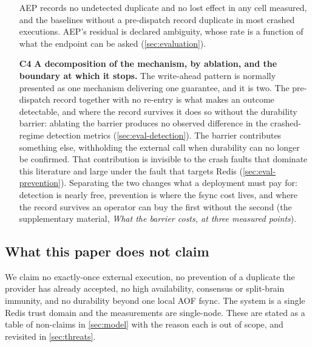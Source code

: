 \begin{itemize}
      AEP records no
      undetected duplicate and no lost effect in any cell measured, and the
      baselines without a pre-dispatch record duplicate in most crashed
      executions. AEP's residual is declared ambiguity, whose rate is a
      function of what the endpoint can be asked (\cref{sec:evaluation}).
\item[\textbf{C4}] \textbf{A decomposition of the mechanism, by ablation,
      and the boundary at which it stops.} The write-ahead pattern is
      normally presented as one mechanism delivering one guarantee, and it is
      two. The pre-dispatch record together with no re-entry
      is what makes an outcome detectable, and where the record survives it
      does so without the
      durability barrier: ablating the barrier produces no observed difference
      in the crashed-regime detection metrics (\cref{sec:eval-detection}). The
      barrier contributes something else, withholding the external call when
      durability can no longer be confirmed. That contribution is invisible to
      the crash faults that dominate this literature and large under the fault
      that targets Redis (\cref{sec:eval-prevention}). Separating the two
      changes what a deployment must pay for: detection is nearly free,
      prevention is where the fsync cost lives, and where the record survives
      an operator can buy the first without the second (the supplementary
      material, \emph{What the barrier costs, at three measured points}).
\end{itemize}

\subsection{What this paper does not claim}

We claim no exactly-once external execution, no prevention of a duplicate the
provider has already accepted, no high availability, consensus or split-brain
immunity, and no durability beyond one local AOF fsync. The system is a single
Redis trust domain and the measurements are single-node. These are stated as a
table of non-claims in \cref{sec:model} with the reason each is out of scope,
and revisited in \cref{sec:threats}.
